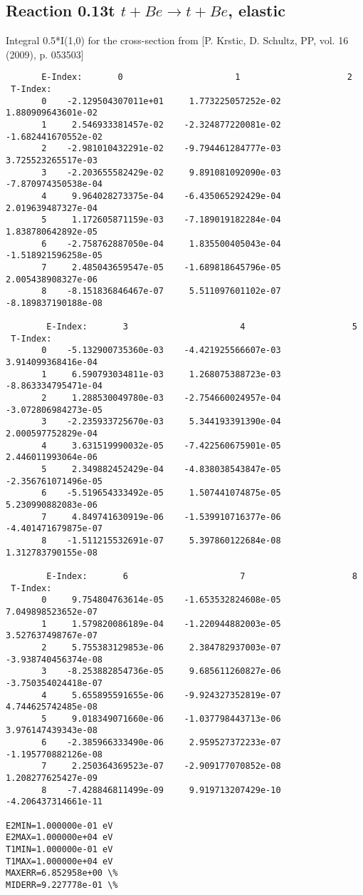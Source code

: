 \documentclass[12pt,dvipdfmx]{article}
\begin{document}
\subsection{
Reaction 0.13t  $t + Be \rightarrow t + Be$, elastic}

Integral 0.5*I(1,0) for the cross-section from [P. Krstic, D. Schultz, PP, vol. 16 (2009), p. 053503]

\begin{small}\begin{verbatim}
       E-Index:       0                      1                     2
 T-Index:
       0    -2.129504307011e+01     1.773225057252e-02     1.880909643601e-02
       1     2.546933381457e-02    -2.324877220081e-02    -1.682441670552e-02
       2    -2.981010432291e-02    -9.794461284777e-03     3.725523265517e-03
       3    -2.203655582429e-02     9.891081092090e-03    -7.870974350538e-04
       4     9.964028273375e-04    -6.435065292429e-04     2.019639487327e-04
       5     1.172605871159e-03    -7.189019182284e-04     1.838780642892e-05
       6    -2.758762887050e-04     1.835500405043e-04    -1.518921596258e-05
       7     2.485043659547e-05    -1.689818645796e-05     2.005438908327e-06
       8    -8.151836846467e-07     5.511097601102e-07    -8.189837190188e-08

        E-Index:       3                      4                     5
 T-Index:
       0    -5.132900735360e-03    -4.421925566607e-03     3.914099368416e-04
       1     6.590793034811e-03     1.268075388723e-03    -8.863334795471e-04
       2     1.288530049780e-03    -2.754660024957e-04    -3.072806984273e-05
       3    -2.235933725670e-03     5.344193391390e-04     2.000597752829e-04
       4     3.631519990032e-05    -7.422560675901e-05     2.446011993064e-06
       5     2.349882452429e-04    -4.838038543847e-05    -2.356761071496e-05
       6    -5.519654333492e-05     1.507441074875e-05     5.230990882083e-06
       7     4.849741630919e-06    -1.539910716377e-06    -4.401471679875e-07
       8    -1.511215532691e-07     5.397860122684e-08     1.312783790155e-08

        E-Index:       6                      7                     8
 T-Index:
       0     9.754804763614e-05    -1.653532824608e-05     7.049898523652e-07
       1     1.579820086189e-04    -1.220944882003e-05     3.527637498767e-07
       2     5.755383129853e-06     2.384782937003e-07    -3.938740456374e-08
       3    -8.253882854736e-05     9.685611260827e-06    -3.750354024418e-07
       4     5.655895591655e-06    -9.924327352819e-07     4.744625742485e-08
       5     9.018349071660e-06    -1.037798443713e-06     3.976147439343e-08
       6    -2.385966333490e-06     2.959527372233e-07    -1.195770882126e-08
       7     2.250364369523e-07    -2.909177070852e-08     1.208277625427e-09
       8    -7.428846811499e-09     9.919713207429e-10    -4.206437314661e-11

E2MIN=1.000000e-01 eV
E2MAX=1.000000e+04 eV
T1MIN=1.000000e-01 eV
T1MAX=1.000000e+04 eV
MAXERR=6.852958e+00 \%
MIDERR=9.227778e-01 \%
\end{verbatim}\end{small}
\newpage
\end{document}
